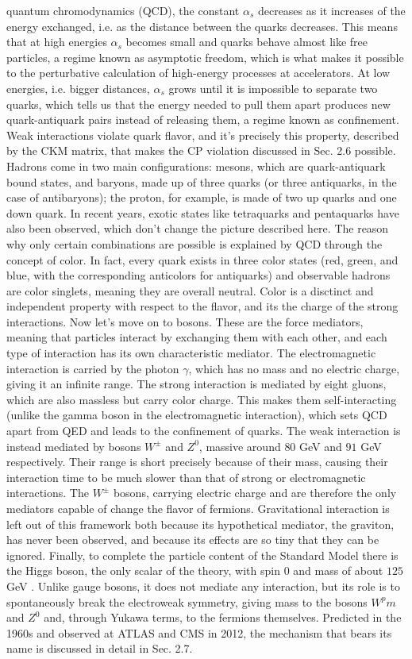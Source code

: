 \documentclass[11pt,a4paper,twoside,openright]{report}
\begin{document}
quantum chromodynamics (QCD), the constant $\alpha_s$ decreases as it increases
of the energy exchanged, i.e. as the distance between the quarks decreases. This means that at high energies $\alpha_s$ becomes small and quarks behave almost like free particles, a regime known as asymptotic freedom, which is what makes it possible to the perturbative calculation of high-energy processes at accelerators. At low energies, i.e. bigger distances, $\alpha_s$ grows until it is impossible to separate two quarks, which tells us that the energy needed to pull them apart produces new quark-antiquark pairs instead of releasing them, a regime known as confinement. Weak interactions violate quark flavor, and it’s precisely this property, described by the CKM matrix, that makes the CP violation discussed in Sec. 2.6 possible. Hadrons come in two main configurations: mesons, which are quark-antiquark bound states, and baryons, made up of three quarks (or three antiquarks, in the case of antibaryons); the proton, for example, is made of two up quarks and one down quark. In recent years, exotic states like tetraquarks and pentaquarks have also been observed, which don't change the picture described here. The reason why only certain combinations are possible is explained by QCD through the concept of color. In fact, every quark exists in three color states (red, green, and blue, with the corresponding anticolors for antiquarks) and observable hadrons are color singlets, meaning they are overall neutral. Color is a disctinct and independent property with respect to the flavor, and its the charge of the strong interactions. Now let's move on to bosons. These are the force mediators, meaning that particles interact by exchanging them with each other, and each type of interaction has its own characteristic mediator. The electromagnetic interaction is carried by the photon $\gamma$, which has no mass and no electric charge, giving it an infinite range. The strong interaction is mediated by eight gluons, which are also massless but carry color charge. This makes them self-interacting (unlike the gamma boson in the electromagnetic interaction), which sets QCD apart from QED and leads to the confinement of quarks. The weak interaction is instead mediated by bosons $W^\pm$ and $Z^0$, massive around $80$ GeV and $91$ GeV respectively. Their range is short precisely because of their mass, causing their interaction time to be much slower than that of strong or electromagnetic interactions. The $W^\pm$ bosons, carrying electric charge and are therefore the only mediators capable of change the flavor of fermions. Gravitational interaction is left out of this framework both because its hypothetical mediator, the graviton, has never been observed, and because its effects are so tiny that they can be ignored. Finally, to complete the particle content of the Standard Model there is the Higgs boson, the only scalar of the theory, with spin $0$ and mass of about $125$ GeV . Unlike gauge bosons, it does not mediate any interaction, but its role is to spontaneously break the electroweak symmetry, giving mass to the bosons $W^pm$ and $Z^0$ and, through Yukawa terms, to the fermions themselves. Predicted in the 1960s and observed at ATLAS and CMS in 2012, the mechanism that bears its name is discussed in detail in Sec. 2.7.
\end{document}
